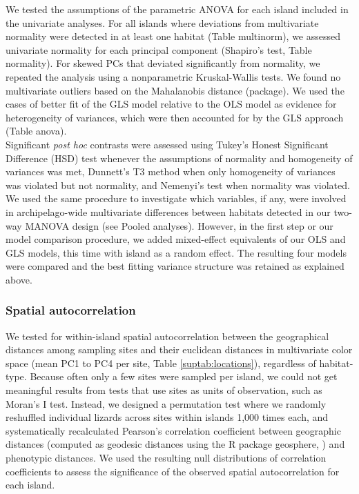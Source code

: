 We tested the assumptions of the parametric ANOVA for each island included in the univariate analyses. For all islands where deviations from multivariate normality were detected in at least one habitat (Table multinorm), we assessed univariate normality for each principal component (Shapiro's test, Table normality). For skewed PCs that deviated significantly from normality, we repeated the analysis using a nonparametric Kruskal-Wallis tests. We found no multivariate outliers based on the Mahalanobis distance (package). We used the cases of better fit of the GLS model relative to the OLS model as evidence for heterogeneity of variances, which were then accounted for by the GLS approach (Table anova).\\

Significant \textit{post hoc} contrasts were assessed using Tukey's Honest Significant Difference (HSD) test whenever the assumptions of normality and homogeneity of variances was met, Dunnett's T3 method when only homogeneity of variances was violated but not normality, and Nemenyi's test when normality was violated.\\

We used the same procedure to investigate which variables, if any, were involved in archipelago-wide multivariate differences between habitats detected in our two-way MANOVA design (see Pooled analyses). However, in the first step or our model comparison procedure, we added mixed-effect equivalents of our OLS and GLS models, this time with island as a random effect. The resulting four models were compared and the best fitting variance structure was retained as explained above.

\subsubsection*{Spatial autocorrelation}

We tested for within-island spatial autocorrelation between the geographical distances among sampling sites and their euclidean distances in multivariate color space (mean PC1 to PC4 per site, Table \ref{suptab:locations}), regardless of habitat-type. Because often only a few sites were sampled per island, we could not get meaningful results from tests that use sites as units of observation, such as Moran's I test. Instead, we designed a permutation test where we randomly reshuffled individual lizards across sites within islands 1,000 times each, and systematically recalculated Pearson's correlation coefficient between geographic distances (computed as geodesic distances using the R package geosphere, \citealt{Hijmans2019}) and phenotypic distances. We used the resulting null distributions of correlation coefficients to assess the significance of the observed spatial autocorrelation for each island.

